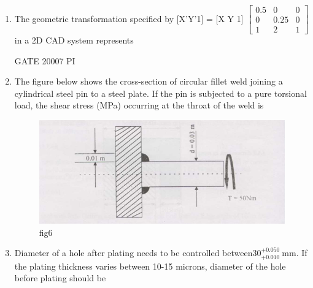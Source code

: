 \documentclass[journal,12pt,onecolumn]{IEEEtran}
\theoremstyle{remark}
\begin{document}
\begin{enumerate}
\item
The geometric transformation specified by [X'Y'1] = [X Y 1]
 $\begin{bmatrix}
0.5 & 0 & 0 \\
0 & 0.25 & 0 \\
1 & 2 & 1
\end{bmatrix}$ in a 2D CAD system represents

\hfill{GATE 20007 PI}
\begin{enumerate}
\end{enumerate}
\item    
The figure below shows the cross-section of circular fillet weld joining a cylindrical steel pin to a steel plate. If the pin is subjected to a pure torsional load, the shear stress (MPa) occurring at the throat of the weld is


    \begin{figure}[H]
        \centering
        \includegraphics[width=0.5\linewidth]{figs/Q.44.png}
        \caption{fig6}
        \label{fig:figs/Q.44.png}
    \end{figure}
\begin{enumerate}
\end{enumerate}

\item 
 Diameter of a hole after plating needs to be controlled between$30^{+0.050}_{+0.010} \ \text{mm.}$ If the plating thickness varies between 10-15 microns, diameter of the hole before plating should be



\end{enumerate}
\end{document}
